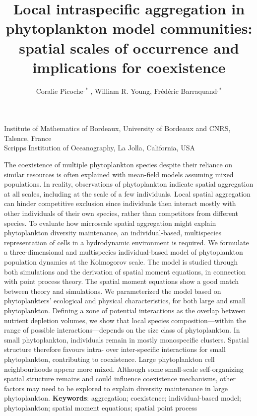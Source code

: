 \documentclass[12pt,english]{article}
\newcommand{\lyxaddress}[1]{
	\par {\raggedright #1
	\vspace{1.4em}
	\noindent\par}
}
\renewenvironment{abstract}
 {\small
  \begin{center}
  \bfseries \abstractname\vspace{-.5em}\vspace{0pt}
  \end{center}
  \list{}{
    \setlength{\leftmargin}{.5cm}%
    \setlength{\rightmargin}{\leftmargin}%
  }%
  \item\relax}
 {\endlist}
\begin{document}
\title{Local intraspecific aggregation in phytoplankton model communities:
spatial scales of occurrence and implications for coexistence}
\author{Coralie Picoche\textonesuperior $^{,*}$ , William R. Young\texttwosuperior ,
Fr\'e{}d\'e{}ric Barraquand\textonesuperior $^{,*}${}}
\maketitle

\thispagestyle{empty}
\vspace{-1cm}

\lyxaddress{}

\lyxaddress{\noindent \begin{center}
\textonesuperior Institute of Mathematics of Bordeaux, University
of Bordeaux and CNRS, Talence, France\\
 \texttwosuperior Scripps Institution of Oceanography, La Jolla, California,
USA 
\par\end{center}}

\onehalfspacing
\linenumbers
\begin{abstract}
The coexistence of multiple phytoplankton species despite their reliance
on similar resources is often explained with mean-field models assuming
mixed populations. In reality, observations of phytoplankton indicate
spatial aggregation at all scales, including at the scale of a few
individuals. Local spatial aggregation can hinder competitive exclusion
since individuals then interact mostly with other individuals of their
own species, rather than competitors from different species. To evaluate
how microscale spatial aggregation might explain phytoplankton diversity
maintenance, an individual-based, multispecies representation of cells
in a hydrodynamic environment is required. We formulate a three-dimensional
and multispecies individual-based model of phytoplankton population
dynamics at the Kolmogorov scale. The model is studied through both
simulations and the derivation of spatial moment equations, in connection
with point process theory. The spatial moment equations show a good
match between theory and simulations. We parameterized the model based
on phytoplankters' ecological and physical characteristics, for both
large and small phytoplankton. Defining a zone of potential interactions
as the overlap between nutrient depletion volumes, we show that local
species composition---within the range of possible interactions---depends
on the size class of phytoplankton. In small phytoplankton, individuals remain in mostly monospecific clusters. Spatial structure therefore favours intra- over inter-specific interactions for small phytoplankton, contributing to coexistence. Large phytoplankton cell neighbourhoods appear more mixed. Although some small-scale self-organizing spatial structure remains and could influence coexistence mechanisms, other factors may need to be explored to explain diversity maintenance in large phytoplankton.%
\end{abstract}
\textbf{Keywords}: aggregation; coexistence; individual-based model;
phytoplankton; spatial moment equations; spatial point process
\end{document}
